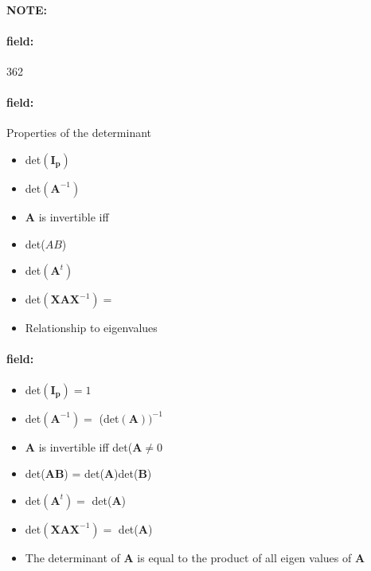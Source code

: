 \documentclass[12pt]{article}
\newenvironment{note}{\paragraph{NOTE:}}{}
\newenvironment{field}{\paragraph{field:}}{}
\begin{document}
\begin{note}
    \begin{field}
        \tiny 362
    \end{field}
    \begin{field}
        Properties of the determinant
        \begin{itemize}
          \item det$(\mathbf{I_p})$
          \item det$(\mathbf{A}^{-1})$
          \item $\mathbf{A}$ is invertible iff
          \item det($AB$)
          \item det$(\mathbf{A}^t)$
          \item det$(\mathbf{XAX}^{-1}) = $
          \item Relationship to eigenvalues
        \end{itemize}
    \end{field}
    \begin{field}
      \begin{itemize}
        \item det$(\mathbf{I_p}) = 1$
        \item det$(\mathbf{A}^{-1}) = $ (det$(\mathbf{A}))^{-1}$
        \item $\mathbf{A}$ is invertible iff det($\mathbf{A} \neq 0$
        \item det($\mathbf{AB}$) = det(\textbf{A})det(\textbf{B})
        \item det$(\mathbf{A}^t) =$ det(\textbf{A})
        \item det$(\mathbf{XAX}^{-1}) = $ det(\textbf{A})
        \item The determinant of $\mathbf{A}$ is equal to the product of all eigen values of $\mathbf{A}$
      \end{itemize}
    \end{field}
\end{note}
\end{document}
